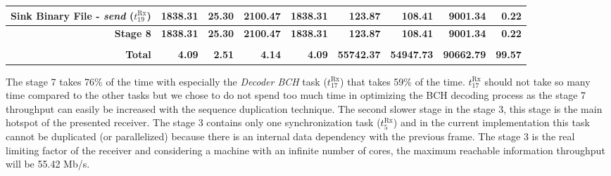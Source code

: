 \begin{table}[htp]
{{\begin{tabular}{r | r r r r  | r r r | r}
    \rowcolor{Paired-7!15}
                 Sink Binary File -          \emph{send} ($t^\text{Rx}_{19}$) &         1838.31  &            25.30  &          2100.47  &                                1838.31  &           123.87  &           108.41  &          9001.34  &          0.22  \\ \hline
                                                             \textbf{Stage 8} & \textbf{1838.31} &    \textbf{25.30} &  \textbf{2100.47} &                        \textbf{1838.31} &   \textbf{123.87} &   \textbf{108.41} &  \textbf{9001.34} &  \textbf{0.22} \\ %
                                                                              &                  &                   &                   &                                         &                   &                   &                   &                \\ \hline \hline
                                                               \textbf{Total} &    \textbf{4.09} &     \textbf{2.51} &     \textbf{4.14} &                           \textbf{4.09} & \textbf{55742.37} & \textbf{54947.73} & \textbf{90662.79} & \textbf{99.57} \\ %
  \end{tabular}
  }}
\end{table}

The stage 7 takes 76\% of the time with especially the \emph{Decoder BCH} task
($t^\text{Rx}_{17}$) that takes 59\% of the time. $t^\text{Rx}_{17}$ should not
take so many time compared to the other tasks but we chose to do not spend too
much time in optimizing the BCH decoding process as the stage 7 throughput can
easily be increased with the sequence duplication technique.
The second slower stage in the stage 3, this stage is the main hotspot of the
presented receiver. The stage 3 contains only one synchronization task
($t^\text{Rx}_{5}$) and in the current implementation this task cannot be
duplicated (or parallelized) because there is an internal data dependency with
the previous frame. The stage 3 is the real limiting factor of the receiver
and considering a machine with an infinite number of cores, the maximum
reachable information throughput will be 55.42 Mb/s.

